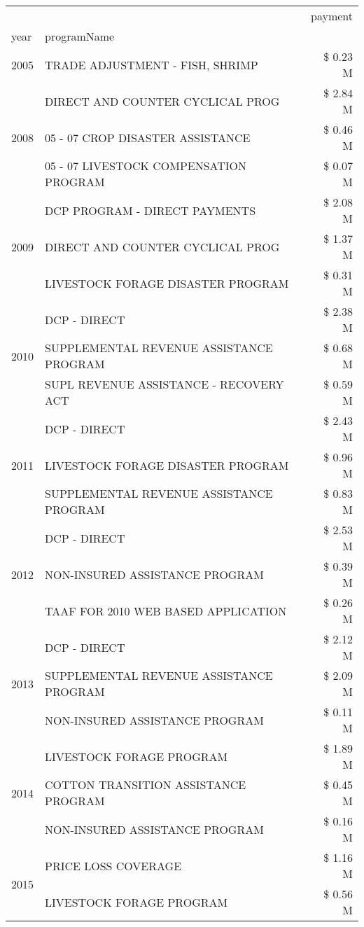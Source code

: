 \begin{tabular}{llr}
\toprule
 &  & payment \\
year & programName &  \\
\midrule
2005 & TRADE ADJUSTMENT - FISH, SHRIMP & \$ 0.23 M \\
\cline{1-3}
\multirow[t]{3}{*}{2008} & DIRECT AND COUNTER CYCLICAL PROG & \$ 2.84 M \\
 & 05 - 07 CROP DISASTER ASSISTANCE & \$ 0.46 M \\
 & 05 - 07 LIVESTOCK COMPENSATION PROGRAM & \$ 0.07 M \\
\cline{1-3}
\multirow[t]{3}{*}{2009} & DCP PROGRAM - DIRECT PAYMENTS & \$ 2.08 M \\
 & DIRECT AND COUNTER CYCLICAL PROG & \$ 1.37 M \\
 & LIVESTOCK FORAGE DISASTER  PROGRAM & \$ 0.31 M \\
\cline{1-3}
\multirow[t]{3}{*}{2010} & DCP - DIRECT & \$ 2.38 M \\
 & SUPPLEMENTAL REVENUE ASSISTANCE PROGRAM & \$ 0.68 M \\
 & SUPL REVENUE ASSISTANCE - RECOVERY ACT & \$ 0.59 M \\
\cline{1-3}
\multirow[t]{3}{*}{2011} & DCP - DIRECT & \$ 2.43 M \\
 & LIVESTOCK FORAGE DISASTER PROGRAM & \$ 0.96 M \\
 & SUPPLEMENTAL REVENUE ASSISTANCE PROGRAM & \$ 0.83 M \\
\cline{1-3}
\multirow[t]{3}{*}{2012} & DCP - DIRECT & \$ 2.53 M \\
 & NON-INSURED ASSISTANCE PROGRAM & \$ 0.39 M \\
 & TAAF FOR 2010 WEB BASED APPLICATION & \$ 0.26 M \\
\cline{1-3}
\multirow[t]{3}{*}{2013} & DCP - DIRECT & \$ 2.12 M \\
 & SUPPLEMENTAL REVENUE ASSISTANCE PROGRAM & \$ 2.09 M \\
 & NON-INSURED ASSISTANCE PROGRAM & \$ 0.11 M \\
\cline{1-3}
\multirow[t]{3}{*}{2014} & LIVESTOCK FORAGE PROGRAM & \$ 1.89 M \\
 & COTTON TRANSITION ASSISTANCE PROGRAM & \$ 0.45 M \\
 & NON-INSURED ASSISTANCE PROGRAM & \$ 0.16 M \\
\cline{1-3}
\multirow[t]{3}{*}{2015} & PRICE LOSS COVERAGE & \$ 1.16 M \\
 & LIVESTOCK FORAGE PROGRAM & \$ 0.56 M \\

\end{tabular}
